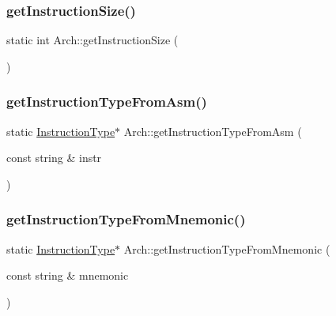 \mbox{\label{classArch_af990ba7bfa96246fe0eda6248b5a9608}} 
\subsubsection{\texorpdfstring{get\+Instruction\+Size()}{getInstructionSize()}}
{\footnotesize\ttfamily static int Arch\+::get\+Instruction\+Size (\begin{DoxyParamCaption}{ }\end{DoxyParamCaption})\hspace{0.3cm}{\ttfamily [static]}}

\mbox{\label{classArch_a25ad6eb3a759792bcb793b61cf629da0}} 
\subsubsection{\texorpdfstring{get\+Instruction\+Type\+From\+Asm()}{getInstructionTypeFromAsm()}}
{\footnotesize\ttfamily static \hyperlink{classInstructionType}{Instruction\+Type}$\ast$ Arch\+::get\+Instruction\+Type\+From\+Asm (\begin{DoxyParamCaption}\item[{const string \&}]{instr }\end{DoxyParamCaption})\hspace{0.3cm}{\ttfamily [static]}}

\mbox{\label{classArch_adc29a91e6fd178a49f2bde6dcc441784}} 
\subsubsection{\texorpdfstring{get\+Instruction\+Type\+From\+Mnemonic()}{getInstructionTypeFromMnemonic()}}
{\footnotesize\ttfamily static \hyperlink{classInstructionType}{Instruction\+Type}$\ast$ Arch\+::get\+Instruction\+Type\+From\+Mnemonic (\begin{DoxyParamCaption}\item[{const string \&}]{mnemonic }\end{DoxyParamCaption})\hspace{0.3cm}{\ttfamily [static]}}

